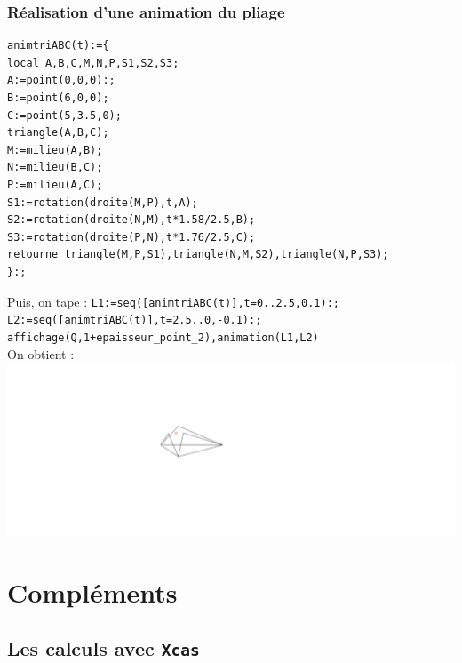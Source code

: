 \documentclass[a4paper,11pt]{book}
\begin{document}
\subsection{R\'ealisation d'une animation du pliage}
\begin{verbatim}
animtriABC(t):={
local A,B,C,M,N,P,S1,S2,S3;
A:=point(0,0,0):;
B:=point(6,0,0);
C:=point(5,3.5,0);
triangle(A,B,C);
M:=milieu(A,B);
N:=milieu(B,C);
P:=milieu(A,C);
S1:=rotation(droite(M,P),t,A);
S2:=rotation(droite(N,M),t*1.58/2.5,B);
S3:=rotation(droite(P,N),t*1.76/2.5,C);
retourne triangle(M,P,S1),triangle(N,M,S2),triangle(N,P,S3);
}:;
\end{verbatim}
Puis, on tape :
{\tt L1:=seq([animtriABC(t)],t=0..2.5,0.1):;}\\
{\tt L2:=seq([animtriABC(t)],t=2.5..0,-0.1):;}\\
{\tt affichage(Q,1+epaisseur\_point\_2),animation(L1,L2)}\\
On obtient :\\
\includegraphics[width=\textwidth]{troisgeo34}

\chapter{Compl\'ements}
\section{Les calculs avec {\tt Xcas} }
\end{document}
